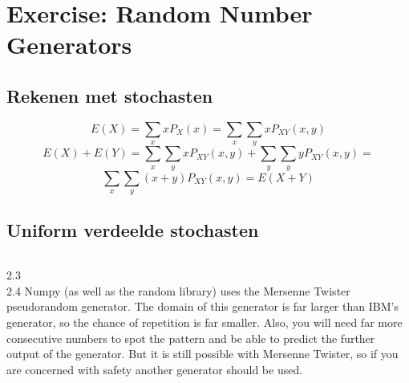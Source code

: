 \documentclass[pdftex,12pt,a4paper]{article}
\begin{document}

\section{Exercise: Random Number Generators}
    \subsection{Rekenen met stochasten}
        $$E(X)=\sum\limits_{x}xP_X(x) = \sum\limits_{x}\sum\limits_{y}xP_{XY}(x,y)$$
        $$E(X) + E(Y) = \sum\limits_{x}\sum\limits_{y}xP_{XY}(x,y) + \sum\limits_{y}\sum\limits_{y}yP_{XY}(x,y) = $$
        $$\sum\limits_{x}\sum\limits_{y}(x + y)P_{XY}(x,y) = E(X+Y)$$

    \subsection{Uniform verdeelde stochasten}
		\inputminted{python}{lab-2.py}
		2.3 \\
        2.4 Numpy (as well as the random library) uses the Mersenne Twister pseudorandom generator. The domain of this generator is far larger than IBM's generator, so the chance of repetition is far smaller. Also, you will need far more  consecutive numbers to spot the pattern and be able to predict the further output of the generator. But it is still possible with Mersenne Twister, so if you are concerned with safety another generator should be used.\\
\end{document}
